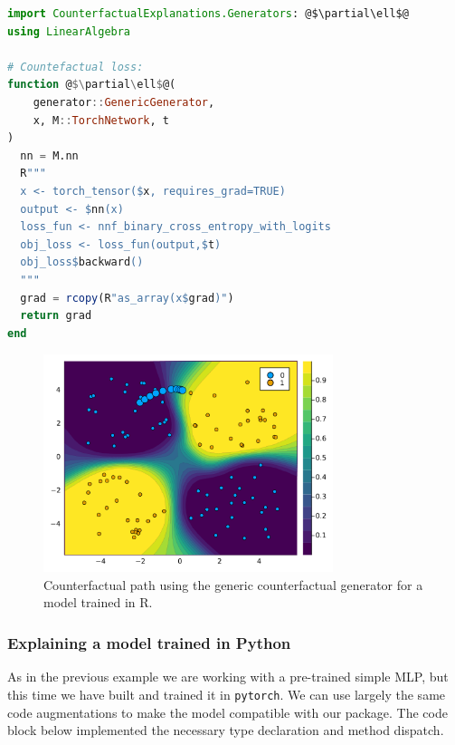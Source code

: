 \documentclass[
  letterpaper,
  DIV=11,
  numbers=noendperiod]{scrartcl}
\begin{document}
\begin{lstlisting}[language=Julia, escapechar=@]
import CounterfactualExplanations.Generators: @$\partial\ell$@
using LinearAlgebra

# Countefactual loss:
function @$\partial\ell$@(
    generator::GenericGenerator, 
    x, M::TorchNetwork, t
) 
  nn = M.nn
  R"""
  x <- torch_tensor($x, requires_grad=TRUE)
  output <- $nn(x)
  loss_fun <- nnf_binary_cross_entropy_with_logits
  obj_loss <- loss_fun(output,$t)
  obj_loss$backward()
  """
  grad = rcopy(R"as_array(x$grad)")
  return grad
end
\end{lstlisting}

\begin{figure}

{\centering \includegraphics[width=3.33333in,height=2.5in]{www/ce_torch.png}

}

\caption{\label{fig-torch}Counterfactual path using the generic
counterfactual generator for a model trained in R.}

\end{figure}

\hypertarget{explaining-a-model-trained-in-python}{%
\subsubsection{Explaining a model trained in
Python}\label{explaining-a-model-trained-in-python}}

As in the previous example we are working with a pre-trained simple MLP,
but this time we have built and trained it in \texttt{pytorch}. We can
use largely the same code augmentations to make the model compatible
with our package. The code block below implemented the necessary type
declaration and method dispatch.
\end{document}
